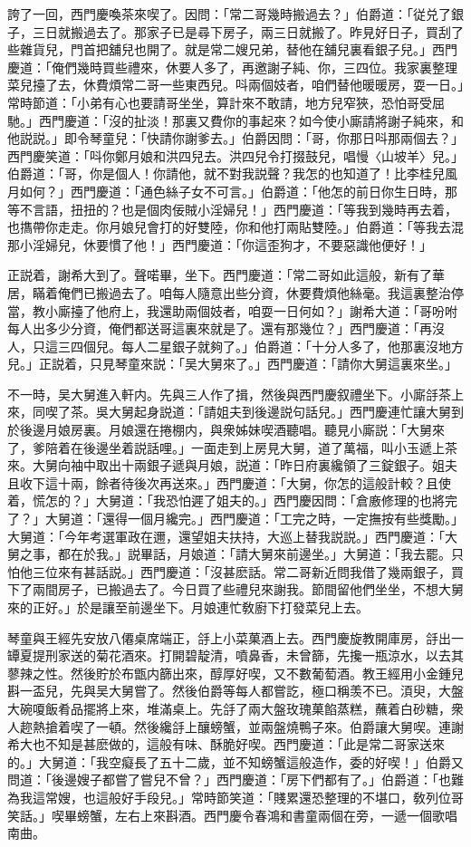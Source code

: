 誇了一回，西門慶喚茶來喫了。因問：「常二哥幾時搬過去？」伯爵道：「従兑了銀子，三日就搬過去了。那家子已是尋下房子，兩三日就搬了。昨見好日子，買刮了些雜貨兒，門首把舖兒也開了。就是常二嫂兄弟，替他在舖兒裏看銀子兒。」西門慶道：「俺們幾時買些禮來，休要人多了，再邀謝子純、你，三四位。我家裏整理菜兒擡了去，休費煩常二哥一些東西兒。呌兩個妓者，咱們替他暖暖房，耍一日。」常時節道：「小弟有心也要請哥坐坐，算計來不敢請，地方兒窄狹，恐怕哥受屈馳。」西門慶道：「沒的扯淡！那裏又費你的事起來？如今使小廝請將謝子純來，和他説説。」即令琴童兒：「快請你謝爹去。」伯爵因問：「哥，你那日呌那兩個去？」西門慶笑道：「呌你鄭月娘和洪四兒去。洪四兒令打掇鼓兒，唱慢〈山坡羊〉兒。」伯爵道：「哥，你是個人！你請他，就不對我説聲？我怎的也知道了！比李桂兒風月如何？」西門慶道：「通色絲子女不可言。」伯爵道：「他怎的前日你生日時，那等不言語，扭扭的？也是個肉佞賊小淫婦兒！」西門慶道：「等我到幾時再去着，也㩦帶你走走。你月娘兒會打的好雙陸，你和他打兩貼雙陸。」伯爵道：「等我去混那小淫婦兒，休要慣了他！」西門慶道：「你這歪狗才，不要惡識他便好！」

正説着，謝希大到了。聲喏畢，坐下。西門慶道：「常二哥如此這般，新有了華居，瞞着俺們已搬過去了。咱每人隨意出些分資，休要費煩他絲毫。我這裏整治停當，教小廝擡了他府上，我還助兩個妓者，咱耍一日何如？」謝希大道：「哥吩咐每人出多少分資，俺們都送哥這裏來就是了。還有那幾位？」西門慶道：「再沒人，只這三四個兒。每人二星銀子就夠了。」伯爵道：「十分人多了，他那裏沒地方兒。」正説着，只見琴童來説：「吴大舅來了。」西門慶道：「請你大舅這裏來坐。」

不一時，吴大舅進入軒内。先與三人作了揖，然後與西門慶叙禮坐下。小廝㧱茶上來，同喫了茶。吳大舅起身説道：「請姐夫到後邊説句話兒。」西門慶連忙讓大舅到於後邊月娘房裏。月娘還在捲棚内，與衆姊妹喫酒聽唱。聽見小廝説：「大舅來了，爹陪着在後邊坐着説話哩。」一面走到上房見大舅，道了萬福，叫小玉遞上茶來。大舅向袖中取出十兩銀子遞與月娘，説道：「昨日府裏纔領了三錠銀子。姐夫且收下這十兩，餘者待後次再送來。」西門慶道：「大舅，你怎的這般計較？且使着，慌怎的？」大舅道：「我恐怕遲了姐夫的。」西門慶因問：「倉廒修理的也將完了？」大舅道：「還得一個月纔完。」西門慶道：「工完之時，一定撫按有些獎勵。」大舅道：「今年考選軍政在邇，還望姐夫扶持，大巡上替我説説。」西門慶道：「大舅之事，都在於我。」説畢話，月娘道：「請大舅來前邊坐。」大舅道：「我去罷。只怕他三位來有甚話説。」西門慶道：「沒甚麽話。常二哥新近問我借了幾兩銀子，買下了兩間房子，已搬過去了。今日買了些禮兒來謝我。節間留他們坐坐，不想大舅來的正好。」於是讓至前邊坐下。月娘連忙敎廚下打發菜兒上去。

琴童與王經先安放八僊桌席端正，㧱上小菜菓酒上去。西門慶旋教開庫房，㧱出一罈夏提刑家送的菊花酒來。打開碧靛清，噴鼻香，未曾篩，先攙一瓶涼水，以去其蓼辣之性。然後貯於布甑内篩出來，醇厚好喫，又不數葡萄酒。教王經用小金鍾兒斟一盃兒，先與吴大舅嘗了。然後伯爵等每人都嘗訖，極口稱羡不已。湏臾，大盤大碗嗄飯肴品擺將上來，堆滿桌上。先㧱了兩大盤玫瑰菓餡蒸糕，蘸着白砂糖，衆人趂熱搶着喫了一頓。然後纔㧱上釀螃蟹，並兩盤燒鴨子來。伯爵讓大舅喫。連謝希大也不知是甚麽做的，這般有味、酥脆好喫。西門慶道：「此是常二哥家送來的。」大舅道：「我空癡長了五十二歲，並不知螃蟹這般造作，委的好喫！」伯爵又問道：「後邊嫂子都嘗了嘗兒不曾？」西門慶道：「房下們都有了。」伯爵道：「也難為我這常嫂，也這般好手段兒。」常時節笑道：「賤累還恐整理的不堪口，敎列位哥笑話。」喫畢螃蟹，左右上來斟酒。西門慶令春鴻和書童兩個在旁，一遞一個歌唱南曲。

